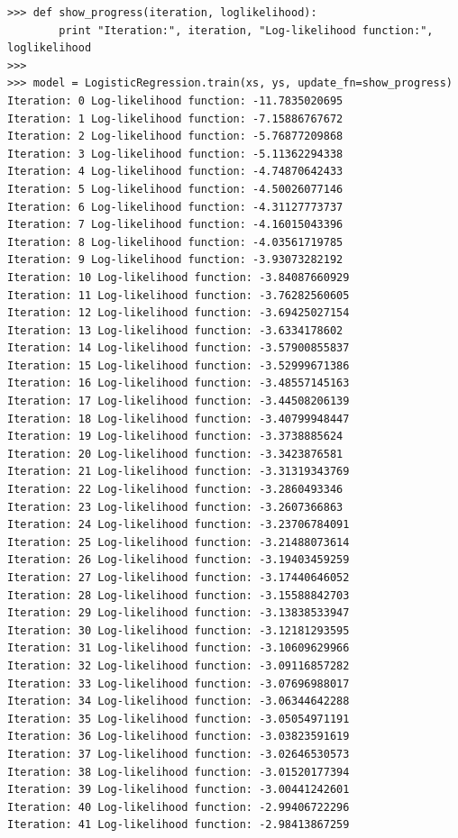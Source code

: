 \documentclass{report}
\begin{document}
\begin{verbatim}
>>> def show_progress(iteration, loglikelihood):
        print "Iteration:", iteration, "Log-likelihood function:", loglikelihood
>>>
>>> model = LogisticRegression.train(xs, ys, update_fn=show_progress)
Iteration: 0 Log-likelihood function: -11.7835020695
Iteration: 1 Log-likelihood function: -7.15886767672
Iteration: 2 Log-likelihood function: -5.76877209868
Iteration: 3 Log-likelihood function: -5.11362294338
Iteration: 4 Log-likelihood function: -4.74870642433
Iteration: 5 Log-likelihood function: -4.50026077146
Iteration: 6 Log-likelihood function: -4.31127773737
Iteration: 7 Log-likelihood function: -4.16015043396
Iteration: 8 Log-likelihood function: -4.03561719785
Iteration: 9 Log-likelihood function: -3.93073282192
Iteration: 10 Log-likelihood function: -3.84087660929
Iteration: 11 Log-likelihood function: -3.76282560605
Iteration: 12 Log-likelihood function: -3.69425027154
Iteration: 13 Log-likelihood function: -3.6334178602
Iteration: 14 Log-likelihood function: -3.57900855837
Iteration: 15 Log-likelihood function: -3.52999671386
Iteration: 16 Log-likelihood function: -3.48557145163
Iteration: 17 Log-likelihood function: -3.44508206139
Iteration: 18 Log-likelihood function: -3.40799948447
Iteration: 19 Log-likelihood function: -3.3738885624
Iteration: 20 Log-likelihood function: -3.3423876581
Iteration: 21 Log-likelihood function: -3.31319343769
Iteration: 22 Log-likelihood function: -3.2860493346
Iteration: 23 Log-likelihood function: -3.2607366863
Iteration: 24 Log-likelihood function: -3.23706784091
Iteration: 25 Log-likelihood function: -3.21488073614
Iteration: 26 Log-likelihood function: -3.19403459259
Iteration: 27 Log-likelihood function: -3.17440646052
Iteration: 28 Log-likelihood function: -3.15588842703
Iteration: 29 Log-likelihood function: -3.13838533947
Iteration: 30 Log-likelihood function: -3.12181293595
Iteration: 31 Log-likelihood function: -3.10609629966
Iteration: 32 Log-likelihood function: -3.09116857282
Iteration: 33 Log-likelihood function: -3.07696988017
Iteration: 34 Log-likelihood function: -3.06344642288
Iteration: 35 Log-likelihood function: -3.05054971191
Iteration: 36 Log-likelihood function: -3.03823591619
Iteration: 37 Log-likelihood function: -3.02646530573
Iteration: 38 Log-likelihood function: -3.01520177394
Iteration: 39 Log-likelihood function: -3.00441242601
Iteration: 40 Log-likelihood function: -2.99406722296
Iteration: 41 Log-likelihood function: -2.98413867259
\end{verbatim}
\end{document}
